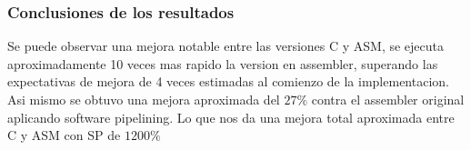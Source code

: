 \subsubsection{Conclusiones de los resultados}
Se puede observar una mejora notable entre las versiones C y ASM, se ejecuta aproximadamente 10 veces mas rapido la version en assembler, superando las expectativas de mejora de 4 veces estimadas al comienzo de la implementacion. Asi mismo se obtuvo una mejora aproximada del $27\%$ contra el assembler original aplicando software pipelining. Lo que nos da una mejora total aproximada entre C y ASM con SP de $1200\%$



